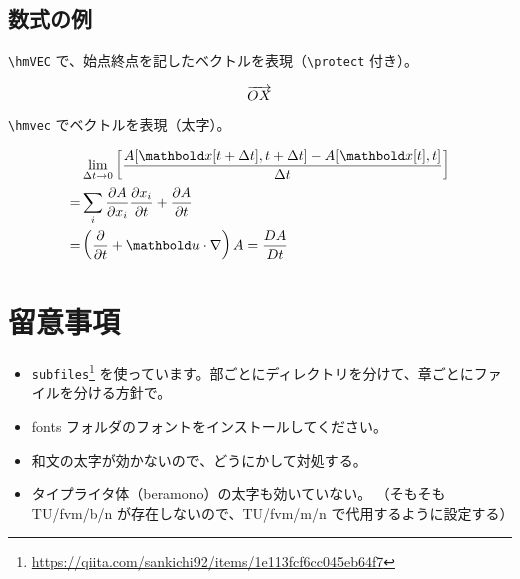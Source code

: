 \documentclass[./body]{subfiles}
\begin{document}

\subsection{数式の例}

\verb+\hmVEC+ で、始点終点を記したベクトルを表現（\verb+\protect+ 付き）。

\[\protect\overrightarrow{OX}\]

\verb+\hmvec+ でベクトルを表現（太字）。

\begin{align*}
&\lim_{\Delta t\to0}\left[\frac{A[\hmvec{x}[t+\Delta t],t+\Delta t]-A[\hmvec{x}[t],t]}{\Delta t}\right]\\
=&\sum_i \frac{\partial A}{\partial x_i}\frac{\partial x_i}{\partial t}+\frac{\partial A}{\partial t}\\
=&\left(\frac{\partial}{\partial t}+\hmvec{u}\cdot\nabla\right)A=\frac{DA}{Dt}
\end{align*}


\section{留意事項}

\begin{itemize}
\item \texttt{subfiles}\footnote{\url{https://qiita.com/sankichi92/items/1e113fcf6cc045eb64f7}}
	を使っています。部ごとにディレクトリを分けて、章ごとにファイルを分ける方針で。
\item fonts フォルダのフォントをインストールしてください。
\item 和文の太字が効かないので、どうにかして対処する。
\item タイプライタ体（beramono）の太字も効いていない。
	（そもそも TU/fvm/b/n が存在しないので、TU/fvm/m/n で代用するように設定する）
\end{itemize}
\end{document}
